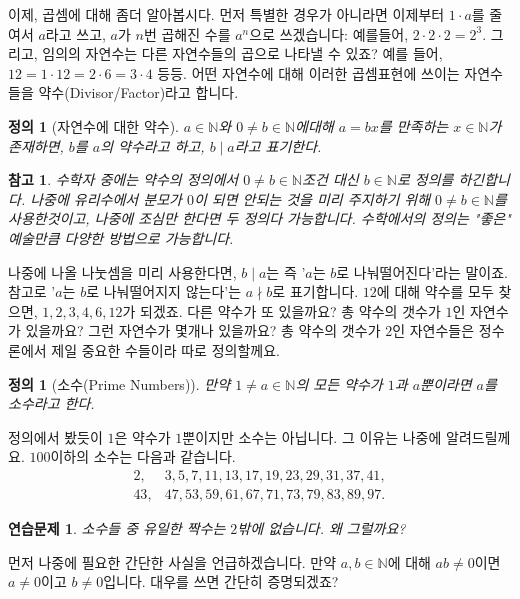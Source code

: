 \documentclass[a4paper, 11pt]{report}
\renewcommand{\<}{\langle}
\renewcommand{\>}{\rangle}
\newtheorem{dfn}[thm]{정의}
\newtheorem{remark}[thm]{참고}
\newtheorem{exercise}[thm]{연습문제}
\begin{document}
이제, 곱셈에 대해 좀더 알아봅시다. 먼저 특별한 경우가 아니라면 이제부터 $1\cdot a$를 줄여서 
$a$라고 쓰고, $a$가 $n$번 곱해진 수를 $a^n$으로 쓰겠습니다: 예를들어, $2\cdot2 \cdot 2 = 2^3$.
그리고, 임의의 자연수는 다른 자연수들의 곱으로 나타낼 수 있죠? 예를 들어,
$12 = 1\cdot12 = 2\cdot6 = 3\cdot 4$ 등등. 어떤 자연수에 대해 이러한 곱셈표현에 쓰이는 자연수들을 
약수(Divisor/Factor)라고 합니다.

\begin{dfn}[자연수에 대한 약수]
  $a \in \mathbb{N}$와 $0 \neq b \in \mathbb{N}$에대해 $a = bx$를 만족하는 $x \in \mathbb{N}$가 존재하면, 
  $b$를 $a$의 약수라고 하고, $b \mid a$라고 표기한다.
\end{dfn}

\begin{remark}
  수학자 중에는 약수의 정의에서 $0 \neq b \in \mathbb{N}$조건 대신 $b \in \mathbb{N}$로 정의를 하긴합니다. 
  나중에 유리수에서 분모가 $0$이 되면 안되는 것을 미리 주지하기 위해 $0 \neq b \in \mathbb{N}$를 사용한것이고,
  나중에 조심만 한다면 두 정의다 가능합니다. 수학에서의 정의는 "좋은" 예술만큼 다양한 방법으로 가능합니다.
\end{remark}

나중에 나올 나눗셈을 미리 사용한다면, $b \mid a$는 즉 '$a$는 $b$로 나눠떨어진다'라는 말이죠. 
참고로 '$a$는 $b$로 나눠떨어지지 않는다'는 $a \nmid b$로 표기합니다. $12$에
대해 약수를 모두 찾으면, $1, 2, 3, 4, 6, 12$가 되겠죠. 다른 약수가 또 있을까요? 총 약수의 갯수가 $1$인 자연수가
있을까요? 그런 자연수가 몇개나 있을까요? 총 약수의 갯수가 $2$인 자연수들은 정수론에서 제일 중요한 수들이라 따로
정의할께요.

\begin{dfn}[소수(Prime Numbers)]
  만약 $1 \neq a \in \mathbb{N}$의 모든 약수가 $1$과 $a$뿐이라면 $a$를 소수라고 한다.
\end{dfn}

정의에서 봤듯이 $1$은 약수가 $1$뿐이지만 소수는 아닙니다. 그 이유는 나중에 알려드릴께요. $100$이하의 소수는 
다음과 같습니다.
\begin{align*}
2,& 3, 5, 7, 11, 13, 17, 19, 23, 29, 31, 37, 41,\\ 
43,& 47, 53, 59, 61, 67, 71, 73, 79, 83, 89, 97.
\end{align*}

\begin{exercise}
  소수들 중 유일한 짝수는 $2$밖에 없습니다. 왜 그럴까요? 
\end{exercise}

먼저 나중에 필요한 간단한 사실을 언급하겠습니다. 만약 $a, b \in \mathbb{N}$에 대해 $ab \neq 0$이면 $a \neq 0$이고 
$b \neq 0$입니다. 대우를 쓰면 간단히 증명되겠죠? 
\end{document}
